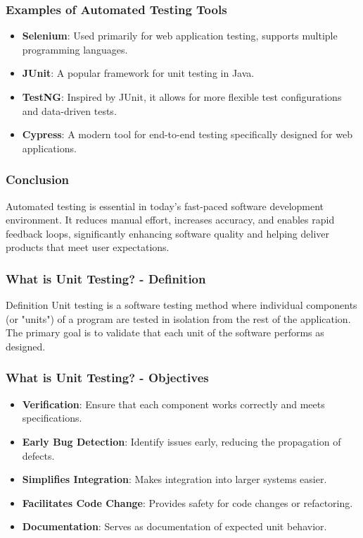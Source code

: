 \documentclass{beamer}
\begin{document}
\begin{frame}[fragile]
    \frametitle{Examples of Automated Testing Tools}
    \begin{itemize}
        \item \textbf{Selenium}: 
        Used primarily for web application testing, supports multiple programming languages.
        
        \item \textbf{JUnit}: 
        A popular framework for unit testing in Java.
        
        \item \textbf{TestNG}: 
        Inspired by JUnit, it allows for more flexible test configurations and data-driven tests.
        
        \item \textbf{Cypress}: 
        A modern tool for end-to-end testing specifically designed for web applications.
    \end{itemize}
\end{frame}

\begin{frame}[fragile]
    \frametitle{Conclusion}
    Automated testing is essential in today's fast-paced software development environment. 
    It reduces manual effort, increases accuracy, and enables rapid feedback loops, significantly 
    enhancing software quality and helping deliver products that meet user expectations.
\end{frame}

\begin{frame}[fragile]
    \frametitle{What is Unit Testing? - Definition}
    \begin{block}{Definition}
        Unit testing is a software testing method where individual components (or "units") of a program are tested in isolation from the rest of the application. The primary goal is to validate that each unit of the software performs as designed.
    \end{block}
\end{frame}

\begin{frame}[fragile]
    \frametitle{What is Unit Testing? - Objectives}
    \begin{itemize}
        \item \textbf{Verification}: Ensure that each component works correctly and meets specifications.
        \item \textbf{Early Bug Detection}: Identify issues early, reducing the propagation of defects.
        \item \textbf{Simplifies Integration}: Makes integration into larger systems easier.
        \item \textbf{Facilitates Code Change}: Provides safety for code changes or refactoring.
        \item \textbf{Documentation}: Serves as documentation of expected unit behavior.
    \end{itemize}
\end{frame}
\end{document}
